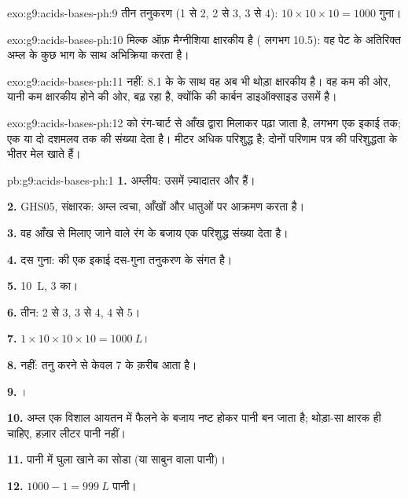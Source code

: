 \begin{solution}{exo:g9:acids-bases-ph:9}
तीन तनुकरण (1 से 2, 2 से 3, 3 से 4): $10 \times 10 \times 10 =
1000$ गुना।
\end{solution}

\begin{solution}{exo:g9:acids-bases-ph:10}
मिल्क ऑफ़ मैग्नीशिया क्षारकीय है ( लगभग 10.5): वह पेट के अतिरिक्त अम्ल के
कुछ भाग के साथ अभिक्रिया करता है।
\end{solution}

\begin{solution}{exo:g9:acids-bases-ph:11}
नहीं: 8.1 के  के साथ वह अब भी थोड़ा क्षारकीय है। वह कम  की ओर, यानी कम
क्षारकीय होने की ओर, बढ़ रहा है, क्योंकि  की कार्बन डाइऑक्साइड उसमें
 है।
\end{solution}

\begin{solution}{exo:g9:acids-bases-ph:12}
 को रंग-चार्ट से आँख द्वारा मिलाकर पढ़ा जाता है, लगभग एक इकाई तक;  एक या दो दशमलव तक की संख्या देता है। मीटर अधिक परिशुद्ध है; दोनों परिणाम
पत्र की परिशुद्धता के भीतर मेल खाते हैं।
\end{solution}

\begin{solution}{pb:g9:acids-bases-ph:1}
\textbf{1.} अम्लीय: उसमें ज़्यादातर  और 
 हैं।

\textbf{2.} GHS05, संक्षारक: अम्ल त्वचा, आँखों और धातुओं पर आक्रमण करता है।

\textbf{3.} वह आँख से मिलाए जाने वाले रंग के बजाय एक परिशुद्ध संख्या
देता है।

\textbf{4.} दस गुना:  की एक इकाई दस-गुना तनुकरण के संगत है।

\textbf{5.} \qty{10}{L},  3 का।

\textbf{6.} तीन:  2 से 3, 3 से 4, 4 से 5।

\textbf{7.} $1 \times 10 \times 10 \times 10 = \qty{1000}{L}$।

\textbf{8.} नहीं: तनु करने से  केवल 7 के क़रीब आता है।

\textbf{9.} ।

\textbf{10.} अम्ल एक विशाल आयतन में फैलने के बजाय नष्ट होकर पानी बन जाता है;
थोड़ा-सा क्षारक ही चाहिए, हज़ार लीटर पानी
नहीं।

\textbf{11.} पानी में घुला खाने का सोडा (या साबुन वाला पानी)।

\textbf{12.} $1000 - 1 = \qty{999}{L}$ पानी।
\end{solution}
